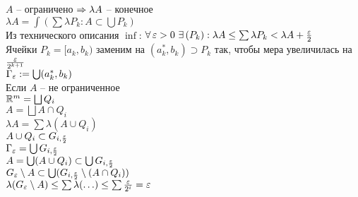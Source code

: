 \documentclass[12pt]{article}
\begin{document}
\begin{enumerate}
    $A$ -- ограничено $\Rightarrow \lambda A$ -- конечное\\
    $\lambda A = \int(\sum \lambda P_k: A \subset \bigcup P_k)$\\
    Из технического описания $\inf$: $\forall\, \varepsilon > 0\ \exists\, (P_k): \lambda A \leq \sum \lambda P_k < \lambda A + \frac{\varepsilon}2$\\
    Ячейки $P_k = [a_k, b_k)$ заменим на $(a_k^*, b_k) \supset P_k$ так, чтобы мера увеличилась на $\frac{\varepsilon}{2^{k+1}}$\\
    $\Gamma_\varepsilon := \bigcup (a_k^*, b_k)$\\
    Если $A$ -- не ограниченное\\
    $\mathbb{R}^m = \bigsqcup Q_i$\\
    $A = \bigsqcup A \cap Q_i$\\
    $\lambda A = \sum \lambda (A \cup Q_i)$\\
    $A \cup Q_i \subset G_{i, \frac{\varepsilon}2}$\\
    $\Gamma_\varepsilon = \bigcup G_{i, \frac{\varepsilon}2}$\\
    $A = \bigcup (A\cup Q_i) \subset \bigcup G_{i, \frac{\varepsilon}2}$\\
    $G_\varepsilon \setminus A \subset \bigcup (G_{i, \frac{\varepsilon}2} \setminus (A \cap Q_i))$\\
    $\lambda(G_\varepsilon \setminus A) \leq \sum \lambda(\ldots) \leq \sum \frac{\varepsilon}{2^i} = \varepsilon$
\end{enumerate}
\end{document}
